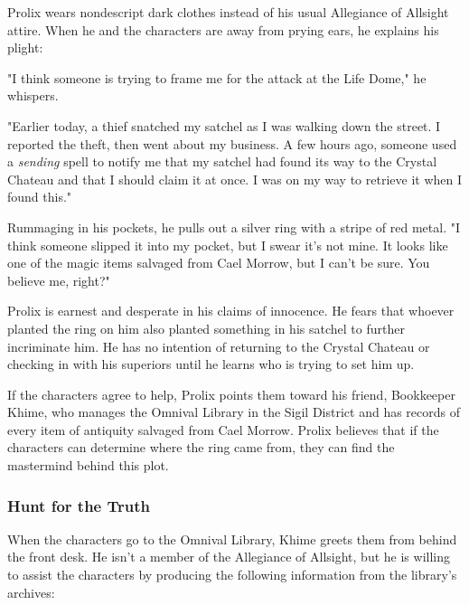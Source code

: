 \documentclass[10pt,a4paper,twoside,bg=print,twocolumn,openany,nodeprecatedcode]{dndbook}
\begin{document}
Prolix wears nondescript dark clothes instead of his usual Allegiance of Allsight attire. When he and the characters are away from prying ears, he explains his plight:

\begin{DndReadAloud}{}
"I think someone is trying to frame me for the attack at the Life Dome," he whispers.

"Earlier today, a thief snatched my satchel as I was walking down the street. I reported the theft, then went about my business. A few hours ago, someone used a \textit{sending} spell to notify me that my satchel had found its way to the Crystal Chateau and that I should claim it at once. I was on my way to retrieve it when I found this."

Rummaging in his pockets, he pulls out a silver ring with a stripe of red metal. "I think someone slipped it into my pocket, but I swear it's not mine. It looks like one of the magic items salvaged from Cael Morrow, but I can't be sure. You believe me, right?"

\end{DndReadAloud}

Prolix is earnest and desperate in his claims of innocence. He fears that whoever planted the ring on him also planted something in his satchel to further incriminate him. He has no intention of returning to the Crystal Chateau or checking in with his superiors until he learns who is trying to set him up.

If the characters agree to help, Prolix points them toward his friend, Bookkeeper Khime, who manages the Omnival Library in the Sigil District and has records of every item of antiquity salvaged from Cael Morrow. Prolix believes that if the characters can determine where the ring came from, they can find the mastermind behind this plot.

\subsubsection{Hunt for the Truth}
When the characters go to the Omnival Library, Khime greets them from behind the front desk. He isn't a member of the Allegiance of Allsight, but he is willing to assist the characters by producing the following information from the library's archives:
\end{document}
